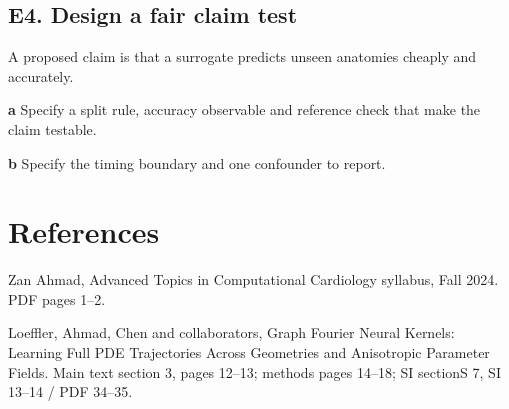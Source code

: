 \documentclass[11pt,letterpaper]{article}
\theoremstyle{definition}\newtheorem{definition}{Definition}\newtheorem{example}{Example}
\numberwithin{equation}{section}
\begin{document}
\par\noindent\begin{minipage}{\linewidth}
\subsection*{E4. Design a fair claim test}
A proposed claim is that a surrogate predicts unseen anatomies cheaply and accurately.

\textbf{a} Specify a split rule, accuracy observable and reference check that make the claim testable.

\end{minipage}\par\medskip
\textbf{b} Specify the timing boundary and one confounder to report.

\section*{References}
\noindent\begin{minipage}{\linewidth}
Zan Ahmad, Advanced Topics in Computational Cardiology syllabus, Fall 2024. PDF pages 1--2.

\end{minipage}\par\medskip
\noindent\begin{minipage}{\linewidth}
Loeffler, Ahmad, Chen and collaborators, Graph Fourier Neural Kernels: Learning Full PDE Trajectories Across Geometries and Anisotropic Parameter Fields. Main text section 3, pages 12--13; methods pages 14--18; SI sectionS 7, SI 13--14 / PDF 34--35.

\end{minipage}\par\medskip
\end{document}
